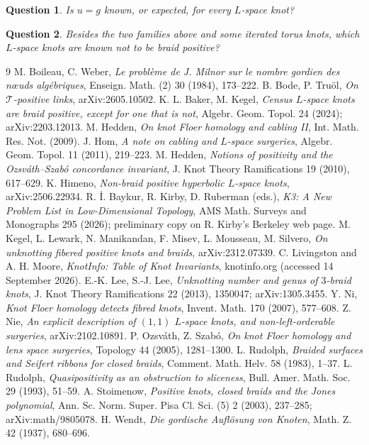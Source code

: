 \documentclass[11pt]{article}
\newtheorem{question}{Question}
\begin{document}
\begin{question}
Is $u = g$ known, or expected, for every $L$-space knot?
\end{question}

\begin{question}
Besides the two families above and some iterated torus knots, which $L$-space knots are known not to be braid positive?
\end{question}

\begin{thebibliography}{9}
 M. Boileau, C. Weber, \emph{Le probl\`eme de J. Milnor sur le nombre gordien des n\oe uds alg\'ebriques},
Enseign. Math. (2) 30 (1984), 173--222.
 B. Bode, P. Tru\"ol, \emph{On $\mathcal{T}$-positive links}, arXiv:2605.10502.
 K. L. Baker, M. Kegel, \emph{Census $L$-space knots are braid positive, except for one that is not},
Algebr. Geom. Topol. 24 (2024); arXiv:2203.12013.
 M. Hedden, \emph{On knot Floer homology and cabling II}, Int. Math. Res. Not. (2009).
 J. Hom, \emph{A note on cabling and $L$-space surgeries}, Algebr. Geom. Topol. 11 (2011), 219--223.
 M. Hedden, \emph{Notions of positivity and the Ozsv\'ath--Szab\'o concordance invariant},
J. Knot Theory Ramifications 19 (2010), 617--629.
 K. Himeno, \emph{Non-braid positive hyperbolic $L$-space knots}, arXiv:2506.22934.
 R. \.I. Baykur, R. Kirby, D. Ruberman (eds.), \emph{K3: A New Problem List in Low-Dimensional Topology},
AMS Math. Surveys and Monographs 295 (2026); preliminary copy on R. Kirby's Berkeley web page.
 M. Kegel, L. Lewark, N. Manikandan, F. Misev, L. Mousseau, M. Silvero, \emph{On unknotting fibered
positive knots and braids}, arXiv:2312.07339.
 C. Livingston and A. H. Moore, \emph{KnotInfo: Table of Knot Invariants}, knotinfo.org
(accessed 14 September 2026).
 E.-K. Lee, S.-J. Lee, \emph{Unknotting number and genus of $3$-braid knots}, J. Knot Theory
Ramifications 22 (2013), 1350047; arXiv:1305.3455.
 Y. Ni, \emph{Knot Floer homology detects fibred knots}, Invent. Math. 170 (2007), 577--608.
 Z. Nie, \emph{An explicit description of $(1,1)$ $L$-space knots, and non-left-orderable surgeries},
arXiv:2102.10891.
 P. Ozsv\'ath, Z. Szab\'o, \emph{On knot Floer homology and lens space surgeries}, Topology 44 (2005),
1281--1300.
 L. Rudolph, \emph{Braided surfaces and Seifert ribbons for closed braids}, Comment. Math. Helv. 58
(1983), 1--37.
 L. Rudolph, \emph{Quasipositivity as an obstruction to sliceness}, Bull. Amer. Math. Soc. 29 (1993),
51--59.
 A. Stoimenow, \emph{Positive knots, closed braids and the Jones polynomial}, Ann. Sc. Norm. Super.
Pisa Cl. Sci. (5) 2 (2003), 237--285; arXiv:math/9805078.
 H. Wendt, \emph{Die gordische Aufl\"osung von Knoten}, Math. Z. 42 (1937), 680--696.
\end{thebibliography}
\end{document}
